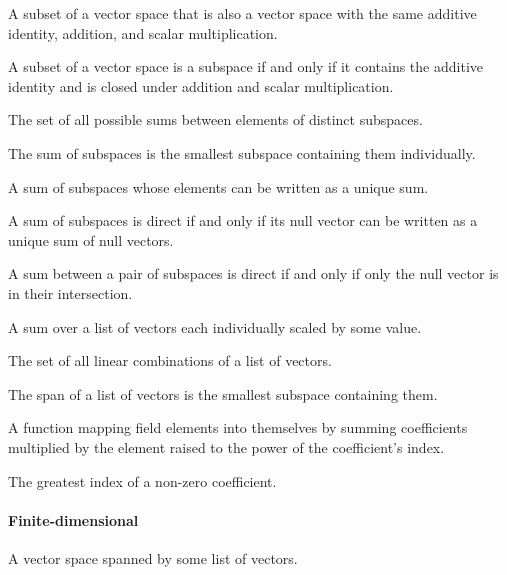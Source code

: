 \pagebreak

\begin{multicols}{3}

  A subset of a vector space that is also a vector space with the same additive identity, addition, and scalar multiplication.
  
  A subset of a vector space is a subspace if and only if it contains the additive identity and is closed under addition and scalar multiplication.

  The set of all possible sums between elements of distinct subspaces.
  
  The sum of subspaces is the smallest subspace containing them individually.
  
  A sum of subspaces whose elements can be written as a unique sum.
  
  A sum of subspaces is direct if and only if its null vector can be written as a unique sum of null vectors.

  A sum between a pair of subspaces is direct if and only if only the null vector is in their intersection.

  A sum over a list of vectors each individually scaled by some value.
  
  The set of all linear combinations of a list of vectors.
  
  The span of a list of vectors is the smallest subspace containing them.

  A function mapping field elements into themselves by summing coefficients multiplied by the element raised to the power of the coefficient's index.
  
  The greatest index of a non-zero coefficient.
  
  \paragraph{\textbf{Finite-dimensional}}
  A vector space spanned by some list of vectors.

\end{multicols}
